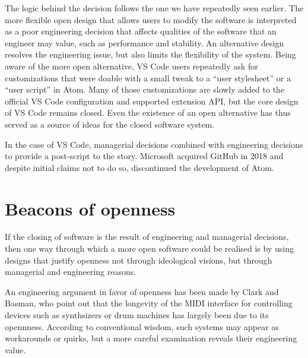 The logic behind the decision follows the one we have repeatedly seen earlier. The more flexible
open design that allows users to modify the software is interpreted as a poor engineering decision
that affects qualities of the software that an engineer may value, such as performance and
stability. An alternative design resolves the engineering issue, but also limits the flexibility
of the system. Being aware of the more open alternative, VS Code users repeatedly ask for
customizations that were doable with a small tweak to a ``user stylesheet'' or a ``user script''
in Atom. Many of those customizations
are slowly added to the official VS Code configuration and supported extension API, but the
core design of VS Code remains closed. Even the existence of an open alternative
has thus served as a source of ideas for the closed software system.

In the case of VS Code, managerial decisions combined with engineering decisions to
provide a post-script to the story. Microsoft acquired GitHub in 2018 and despite initial
claims not to do so, discontinued the development of Atom.

\section{Beacons of openness}
\label{sec:beacons}

If the closing of software is the result of engineering and managerial decisions, then
one way through which a more open software could be realised is by using designs that
justify openness not through ideological visions, but through managerial and
engineering reasons.

An engineering argument in favor of openness has been made by Clark and Basman, who
point out that the longevity of the MIDI interface for controlling devices
such as synthsizers or drum machines has largely been due to its
opennness. According to conventional wisdom,
such systems may appear as workarounds or quirks, but a more careful examination reveals
their engineering value.

